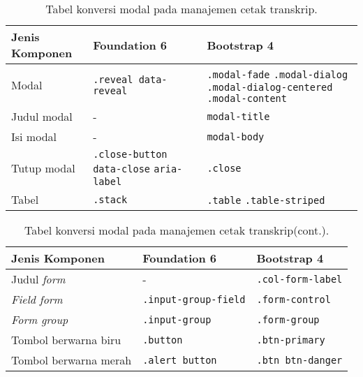 \begin{table}[H]
	\caption{Tabel konversi modal pada manajemen cetak transkrip.}
	\begin{tabular}{| p{} | p{} | p{} |} 
		\hline
		\textbf{Jenis Komponen} & \textbf{Foundation 6} & \textbf{Bootstrap 4}  \\ [0.5ex] 
		\hline	
		Modal & \texttt{.reveal data-reveal} & \texttt{.modal-fade} \newline \texttt{.modal-dialog} \newline \texttt{.modal-dialog-centered} \newline \texttt{.modal-content} \\
		\hline
		Judul modal & - & \texttt{modal-title}\\
		\hline
		Isi modal & - & \texttt{modal-body}\\
		\hline
		Tutup modal & \texttt{.close-button} \newline \texttt{data-close} \newline \texttt{aria-label} & \texttt{.close}\\
		\hline	
		Tabel & \texttt{.stack} & \texttt{.table} \newline \texttt{.table-striped} \\	[1ex]
		\hline 		
	\end{tabular}
\end{table}

\begin{table}[H] \ContinuedFloat
	\caption{Tabel konversi modal pada manajemen cetak transkrip(cont.).}
	\begin{tabular}{| p{} | p{} | p{} |} 
		\hline
		\textbf{Jenis Komponen} & \textbf{Foundation 6} & \textbf{Bootstrap 4}  \\ [0.5ex] 
		\hline	
		Judul \textit{form} & - & \texttt{.col-form-label}\\
		\hline
		\textit{Field form} & \texttt{.input-group-field} & \texttt{.form-control}\\
		\hline
		\textit{Form group} & \texttt{.input-group} & \texttt{.form-group}\\
		\hline
		Tombol berwarna biru & \texttt{.button} & \texttt{.btn-primary}  \\
		\hline
		Tombol berwarna merah & \texttt{.alert button} & \texttt{.btn btn-danger} \\[1ex]
		\hline
	\end{tabular}
	\label{table:konversiModalManajemenCetakTranskrip}
\end{table}

